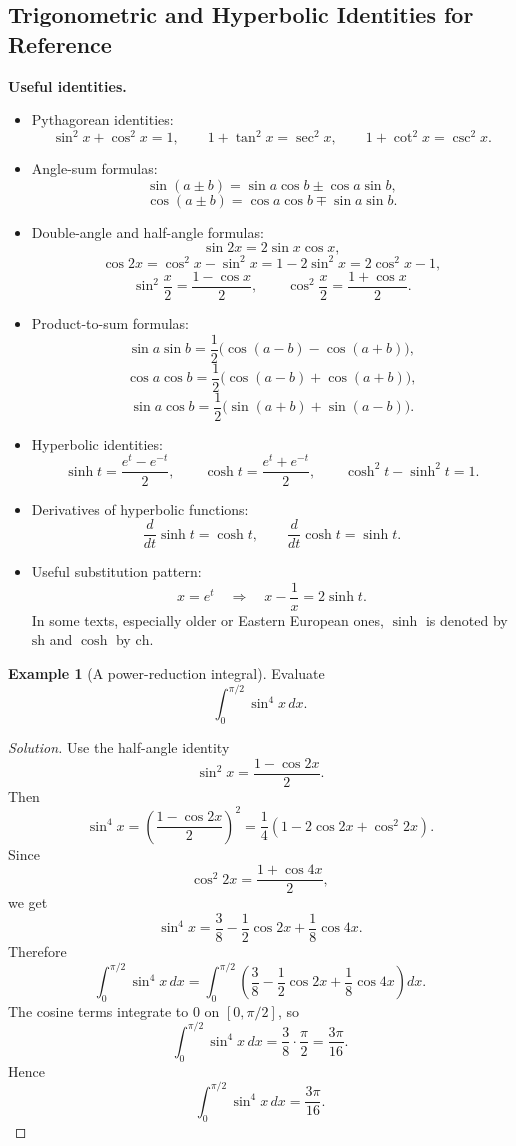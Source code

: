 \documentclass[11pt]{article}
\theoremstyle{definition}
\newtheorem{example}{Example}[section]
\begin{document}
\subsection{Trigonometric and Hyperbolic Identities for Reference}
\textbf{Useful identities.}
\begin{itemize}
    \item Pythagorean identities:
    \[
        \sin^2 x + \cos^2 x = 1,
        \qquad
        1+\tan^2 x = \sec^2 x,
        \qquad
        1+\cot^2 x = \csc^2 x.
    \]
    \item Angle-sum formulas:
    \[
        \sin(a\pm b)=\sin a\cos b \pm \cos a\sin b,
    \]
    \[
        \cos(a\pm b)=\cos a\cos b \mp \sin a\sin b.
    \]
    \item Double-angle and half-angle formulas:
    \[
        \sin 2x = 2\sin x\cos x,
    \]
    \[
        \cos 2x = \cos^2 x - \sin^2 x = 1-2\sin^2 x = 2\cos^2 x -1,
    \]
    \[
        \sin^2\frac{x}{2} = \frac{1-\cos x}{2},
        \qquad
        \cos^2\frac{x}{2} = \frac{1+\cos x}{2}.
    \]
    \item Product-to-sum formulas:
    \[
        \sin a\sin b = \frac{1}{2}\bigl(\cos(a-b)-\cos(a+b)\bigr),
    \]
    \[
        \cos a\cos b = \frac{1}{2}\bigl(\cos(a-b)+\cos(a+b)\bigr),
    \]
    \[
        \sin a\cos b = \frac{1}{2}\bigl(\sin(a+b)+\sin(a-b)\bigr).
    \]
    \item Hyperbolic identities:
    \[
        \sinh t = \frac{e^t-e^{-t}}{2},
        \qquad
        \cosh t = \frac{e^t+e^{-t}}{2},
        \qquad
        \cosh^2 t - \sinh^2 t = 1.
    \]
    \item Derivatives of hyperbolic functions:
    \[
        \frac{d}{dt}\sinh t = \cosh t,
        \qquad
        \frac{d}{dt}\cosh t = \sinh t.
    \]
    \item Useful substitution pattern:
    \[
        x=e^t \quad \Longrightarrow \quad x-\frac{1}{x}=2\sinh t.
    \]
    In some texts, especially older or Eastern European ones, $\sinh$ is denoted by $\mathrm{sh}$ and $\cosh$ by $\mathrm{ch}$.
\end{itemize}

\begin{example}[A power-reduction integral]
Evaluate
\[
\int_0^{\pi/2} \sin^4 x\,dx.
\]
\end{example}

\begin{proof}[Solution]
Use the half-angle identity
\[
\sin^2 x=\frac{1-\cos 2x}{2}.
\]
Then
\[
\sin^4 x=\left(\frac{1-\cos 2x}{2}\right)^2
=\frac14\left(1-2\cos 2x+\cos^2 2x\right).
\]
Since
\[
\cos^2 2x=\frac{1+\cos 4x}{2},
\]
we get
\[
\sin^4 x=\frac38-\frac12\cos 2x+\frac18\cos 4x.
\]
Therefore
\[
\int_0^{\pi/2} \sin^4 x\,dx
=\int_0^{\pi/2}\left(\frac38-\frac12\cos 2x+\frac18\cos 4x\right)dx.
\]
The cosine terms integrate to $0$ on $[0,\pi/2]$, so
\[
\int_0^{\pi/2} \sin^4 x\,dx=\frac38\cdot \frac{\pi}{2}=\frac{3\pi}{16}.
\]
Hence
\[
\boxed{\int_0^{\pi/2} \sin^4 x\,dx=\frac{3\pi}{16}}.
\]
\end{proof}
\end{document}
